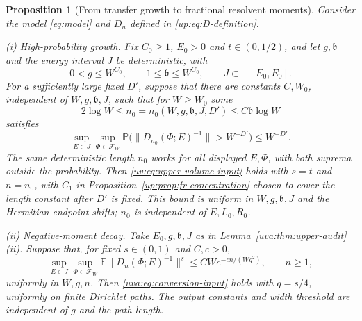 \documentclass[11pt]{article}
\numberwithin{equation}{section}
\newtheorem{proposition}[theorem]{Proposition}
\theoremstyle{remark}
\newcommand{\E}{\mathbb E}
\newcommand{\Prob}{\mathbb P}
\begin{document}
\begin{proposition}[From transfer growth to fractional resolvent moments]
\label{up:prop:conversion}
Consider the model \eqref{eq:model} and $D_n$ defined in
\eqref{up:eq:D-definition}.

\noindent\textup{(i) High-probability growth.} Fix $C_0\ge1$, $E_0>0$ and $t\in(0,1/2)$, and let
$g,\mathfrak b$ and the energy interval $J$ be deterministic, with
\[
 0<g\le W^{C_0},\qquad 1\le\mathfrak b\le W^{C_0},\qquad
 J\subset[-E_0,E_0].
\]
For a sufficiently large fixed $D'$, suppose that there are constants
$C,W_0$, independent of $W,g,\mathfrak b,J$, such that for $W\ge W_0$ some
\[
 2\log W\le n_0=n_0(W,g,\mathfrak b,J,D')
       \le C\mathfrak b\log W
\]
satisfies
\begin{equation}\label{up:eq:input}
 \sup_{E\in J}\sup_{\Phi\in\mathcal F_W}
 \Prob\bigl(\|D_{n_0}(\Phi;E)^{-1}\|>W^{-D'}\bigr)
 \le W^{-D'}.
\end{equation}
The same deterministic length
$n_0$ works for all displayed $E,\Phi$, with both suprema outside
the probability. Then \eqref{uv:eq:upper-volume-input} holds with
$s=t$ and $n=n_0$, with $C_1$ in
Proposition~\ref{up:prop:fr-concentration} chosen to cover the length
constant after $D'$ is fixed. This bound is uniform in $W,g,\mathfrak b,J$
and the Hermitian endpoint shifts; $n_0$ is independent of $E,L_0,R_0$.

\noindent\textup{(ii) Negative-moment decay.} Take $E_0,g,\mathfrak b,J$
as in Lemma~\ref{uva:thm:upper-audit}\textup{(ii)}. Suppose that, for
fixed $s\in(0,1)$ and $C,c>0$,
\begin{equation}\label{up:eq:negative-transfer-input}
 \sup_{E\in J}\sup_{\Phi\in\mathcal F_W}
 \E\|D_n(\Phi;E)^{-1}\|^s
 \le CW e^{-cn/(Wg^2)},\qquad n\ge1,
\end{equation}
uniformly in $W,g,n$. Then \eqref{uva:eq:conversion-input} holds with
$q=s/4$, uniformly on finite Dirichlet paths. The output constants
and width threshold are independent of $g$ and the path length.
\end{proposition}
\end{document}
